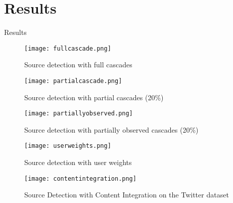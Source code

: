 \section{Results}

\begin{frame}
        \centering
        \huge Results
\end{frame}

\begin{frame}
	\begin{figure}
		\centering
		\texttt{[image: fullcascade.png]}
		\caption{Source detection with full cascades}
	\end{figure}
\end{frame}

\begin{frame}
	\begin{figure}
		\centering
		\texttt{[image: partialcascade.png]}
		\caption{Source detection with partial cascades (20\%)}
	\end{figure}
\end{frame}

\begin{frame}
	\begin{figure}
		\centering
		\texttt{[image: partiallyobserved.png]}
		\caption{Source detection with partially observed cascades (20\%)}
	\end{figure}
\end{frame}

\begin{frame}
	\begin{figure}
		\centering
		\texttt{[image: userweights.png]}
		\caption{Source detection with user weights}
	\end{figure}
\end{frame}

\begin{frame}
	\begin{figure}
		\centering
		\texttt{[image: contentintegration.png]}
		\caption{Source Detection with Content Integration on the Twitter dataset}
	\end{figure}
\end{frame}